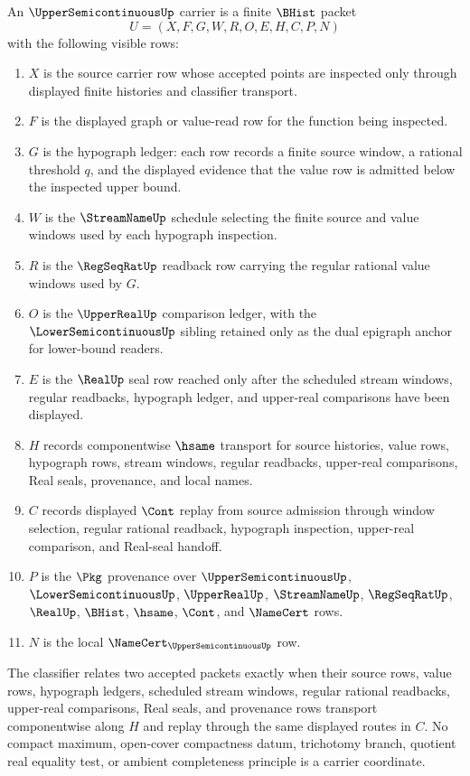 \begin{definition}
\label{def:upper-semicontinuous-carrier}
An $\UpperSemicontinuousUp$ carrier is a finite $\BHist$ packet
$$
U=(X,F,G,W,R,O,E,H,C,P,N)
$$
with the following visible rows:
\begin{enumerate}
\item $X$ is the source carrier row whose accepted points are inspected only
  through displayed finite histories and classifier transport.
\item $F$ is the displayed graph or value-read row for the function being
  inspected.
\item $G$ is the hypograph ledger: each row records a finite source window,
  a rational threshold $q$, and the displayed evidence that the value row is
  admitted below the inspected upper bound.
\item $W$ is the $\StreamNameUp$ schedule selecting the finite source and
  value windows used by each hypograph inspection.
\item $R$ is the $\RegSeqRatUp$ readback row carrying the regular rational
  value windows used by $G$.
\item $O$ is the $\UpperRealUp$ comparison ledger, with the
  $\LowerSemicontinuousUp$ sibling retained only as the dual epigraph anchor
  for lower-bound readers.
\item $E$ is the $\RealUp$ seal row reached only after the scheduled stream
  windows, regular readbacks, hypograph ledger, and upper-real comparisons
  have been displayed.
\item $H$ records componentwise $\hsame$ transport for source histories,
  value rows, hypograph rows, stream windows, regular readbacks, upper-real
  comparisons, Real seals, provenance, and local names.
\item $C$ records displayed $\Cont$ replay from source admission through
  window selection, regular rational readback, hypograph inspection,
  upper-real comparison, and Real-seal handoff.
\item $P$ is the $\Pkg$ provenance over $\UpperSemicontinuousUp$,
  $\LowerSemicontinuousUp$, $\UpperRealUp$, $\StreamNameUp$, $\RegSeqRatUp$,
  $\RealUp$, $\BHist$, $\hsame$, $\Cont$, and $\NameCert$ rows.
\item $N$ is the local $\NameCert_{\UpperSemicontinuousUp}$ row.
\end{enumerate}
The classifier relates two accepted packets exactly when their source rows,
value rows, hypograph ledgers, scheduled stream windows, regular rational
readbacks, upper-real comparisons, Real seals, and provenance rows transport
componentwise along $H$ and replay through the same displayed routes in $C$.
No compact maximum, open-cover compactness datum, trichotomy branch, quotient
real equality test, or ambient completeness principle is a carrier coordinate.
\end{definition}

